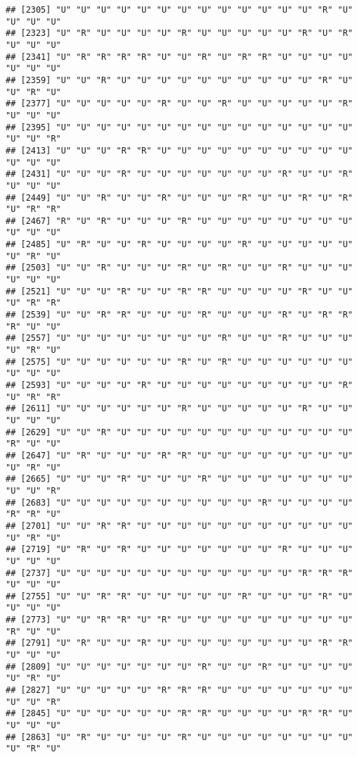 \documentclass[
]{article}
\begin{document}
\begin{verbatim}
## [2305] "U" "U" "U" "U" "U" "U" "U" "U" "U" "U" "U" "U" "U" "R" "U" "U" "U" "U"
## [2323] "U" "R" "U" "U" "U" "U" "R" "U" "U" "U" "U" "U" "R" "U" "R" "U" "U" "U"
## [2341] "U" "R" "R" "R" "R" "U" "U" "R" "U" "R" "R" "U" "U" "U" "U" "U" "U" "U"
## [2359] "U" "U" "R" "U" "U" "U" "U" "U" "U" "U" "U" "U" "U" "R" "U" "U" "R" "U"
## [2377] "U" "U" "U" "U" "U" "R" "U" "U" "R" "U" "U" "U" "U" "U" "R" "U" "U" "U"
## [2395] "U" "U" "U" "U" "U" "U" "U" "U" "U" "U" "U" "U" "U" "U" "U" "U" "U" "R"
## [2413] "U" "U" "U" "R" "R" "U" "U" "U" "U" "U" "U" "U" "U" "U" "U" "U" "U" "U"
## [2431] "U" "U" "U" "R" "U" "U" "U" "U" "U" "U" "U" "R" "U" "U" "R" "U" "U" "U"
## [2449] "U" "U" "R" "U" "U" "R" "U" "U" "U" "R" "U" "U" "R" "U" "R" "U" "R" "R"
## [2467] "R" "U" "R" "U" "U" "U" "R" "U" "U" "U" "U" "U" "U" "U" "U" "U" "U" "U"
## [2485] "U" "R" "U" "U" "R" "U" "U" "U" "U" "R" "U" "U" "U" "U" "U" "U" "R" "U"
## [2503] "U" "U" "R" "U" "U" "U" "R" "U" "R" "U" "U" "R" "U" "U" "U" "U" "U" "U"
## [2521] "U" "U" "U" "R" "U" "U" "R" "R" "U" "U" "U" "U" "R" "U" "U" "U" "R" "R"
## [2539] "U" "U" "R" "R" "U" "U" "U" "R" "U" "U" "U" "R" "U" "R" "R" "R" "U" "U"
## [2557] "U" "U" "U" "U" "U" "U" "U" "U" "R" "U" "U" "R" "U" "U" "U" "U" "R" "U"
## [2575] "U" "U" "U" "U" "U" "U" "R" "U" "R" "U" "U" "U" "U" "U" "U" "U" "U" "U"
## [2593] "U" "U" "U" "U" "R" "U" "U" "U" "U" "U" "U" "U" "U" "U" "R" "U" "R" "R"
## [2611] "U" "U" "U" "U" "U" "U" "R" "U" "U" "U" "U" "U" "R" "U" "U" "U" "U" "U"
## [2629] "U" "U" "R" "U" "U" "U" "U" "U" "U" "U" "U" "U" "U" "U" "U" "R" "U" "U"
## [2647] "U" "R" "U" "U" "U" "R" "R" "U" "U" "U" "U" "U" "U" "U" "U" "U" "R" "U"
## [2665] "U" "U" "U" "R" "U" "U" "U" "R" "U" "U" "U" "U" "U" "U" "U" "U" "U" "R"
## [2683] "U" "U" "U" "U" "U" "U" "U" "U" "U" "U" "R" "U" "U" "U" "U" "R" "R" "U"
## [2701] "U" "U" "R" "R" "U" "U" "U" "U" "U" "U" "U" "U" "U" "U" "U" "U" "R" "U"
## [2719] "U" "R" "U" "R" "U" "U" "U" "U" "U" "U" "U" "R" "U" "U" "U" "U" "U" "U"
## [2737] "U" "U" "U" "U" "U" "U" "U" "U" "U" "U" "U" "U" "R" "R" "R" "U" "U" "U"
## [2755] "U" "U" "R" "R" "U" "U" "U" "U" "U" "R" "U" "U" "U" "R" "U" "U" "U" "U"
## [2773] "U" "U" "R" "R" "U" "R" "U" "U" "U" "U" "U" "U" "U" "U" "U" "R" "U" "U"
## [2791] "U" "R" "U" "U" "R" "U" "U" "U" "U" "U" "U" "U" "U" "R" "R" "U" "U" "U"
## [2809] "U" "U" "U" "U" "U" "U" "U" "R" "U" "U" "R" "U" "U" "U" "U" "U" "R" "U"
## [2827] "U" "U" "U" "U" "U" "R" "R" "R" "U" "U" "U" "U" "U" "U" "U" "U" "U" "R"
## [2845] "U" "U" "U" "U" "U" "U" "R" "R" "U" "U" "U" "U" "R" "R" "U" "U" "U" "U"
## [2863] "U" "R" "U" "U" "U" "U" "R" "U" "U" "U" "U" "U" "U" "U" "U" "U" "R" "U"

\end{verbatim}
\end{document}
